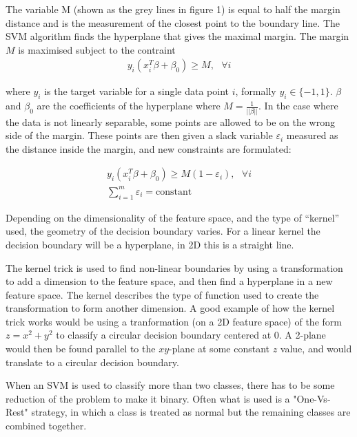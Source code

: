 \documentclass[a4paper,11pt,twoside]{article}
\begin{document}
The variable M (shown as the grey lines in figure 1) is equal to half the margin distance and is the measurement of the closest point to the boundary line. The SVM algorithm finds the hyperplane that gives the maximal margin. The margin $M$ is maximised subject to the contraint
\begin{equation}
\begin{gathered}
y_i(x_i^T \beta+\beta_0)\geq M,\text{ } \forall i
\end{gathered}
\end{equation}

where $y_i$ is the target variable for a single data point $i$, formally $y_i \in \{-1, 1\}$. $\beta$ and $\beta_0$ are the coefficients of the hyperplane where $M=\frac{1}{||\beta||}$. In the case where the data is not linearly separable, some points are allowed to be on the wrong side of the margin. These points are then given a slack variable $\varepsilon_i$ measured as the distance inside the margin, and new constraints are formulated:

\begin{equation}
\begin{gathered}
y_i(x_i^T \beta+\beta_0)\geq M(1-\varepsilon_i),\text{ } \forall i
\\
\sum_{i=1}^m\varepsilon_i = \text{constant}
\end{gathered}
\end{equation}

Depending on the dimensionality of the feature space, and the type of “kernel” used, the geometry of the decision boundary varies. For a linear kernel the decision boundary will be a hyperplane, in 2D this is a straight line. 
\newline

The kernel trick is used to find non-linear boundaries by using a transformation to add a dimension to the feature space, and then find a hyperplane in a new feature space. The kernel describes the type of function used to create the transformation to form another dimension. A good example of how the kernel trick works would be using a tranformation (on a 2D feature space) of the form $z=x^2+y^2$ to classify a circular decision boundary centered at 0. A 2-plane would then be found parallel to the $xy$-plane at some constant $z$ value, and would translate to a circular decision boundary.
\newline

When an SVM is used to classify more than two classes, there has to be some reduction of the problem to make it binary. Often what is used is a "One-Vs-Rest" strategy, in which a class is treated as normal but the remaining classes are combined together.
\end{document}
